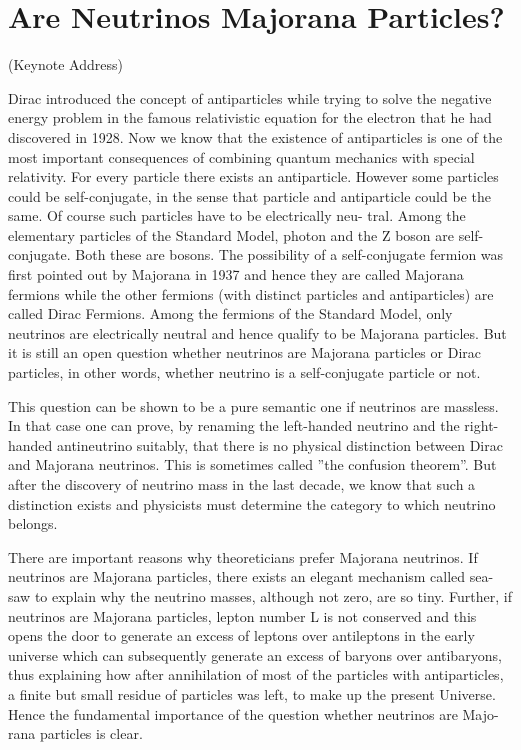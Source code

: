 \chapter{Are Neutrinos Majorana Particles?}\label{chap9}
{\centering\hspace{3.5cm} (Keynote Address)}

\vspace{.2cm}
\lhead[\small\thepage]{\small\leftmark}


Dirac introduced the concept of antiparticles while trying to solve the negative energy
problem in the famous relativistic equation for the electron that he had discovered in 1928.
Now we know that the existence of antiparticles is one of the most important consequences
of combining quantum mechanics with special relativity. For every particle there exists
an antiparticle. However some particles could be self-conjugate, in the sense that particle
and antiparticle could be the same. Of course such particles have to be electrically neu-
tral. Among the elementary particles of the Standard Model, photon and the Z boson are
self-conjugate. Both these are bosons. The possibility of a self-conjugate fermion was first
pointed out by Majorana in 1937 and hence they are called Majorana fermions while the
other fermions (with distinct particles and antiparticles) are called Dirac Fermions. Among
the fermions of the Standard Model, only neutrinos are electrically neutral and hence qualify
to be Majorana particles. But it is still an open question whether neutrinos are Majorana
particles or Dirac particles, in other words, whether neutrino is a self-conjugate particle or
not.


This question can be shown to be a pure semantic one if neutrinos are massless. In that
case one can prove, by renaming the left-handed neutrino and the right-handed antineutrino
suitably, that there is no physical distinction between Dirac and Majorana neutrinos. This
is sometimes called ”the confusion theorem”. But after the discovery of neutrino mass in
the last decade, we know that such a distinction exists and physicists must determine the
category to which neutrino belongs.

There are important reasons why theoreticians prefer Majorana neutrinos. If neutrinos
are Majorana particles, there exists an elegant mechanism called sea-saw to explain why
the neutrino masses, although not zero, are so tiny. Further, if neutrinos are Majorana
particles, lepton number L is not conserved and this opens the door to generate an excess
of leptons over antileptons in the early universe which can subsequently generate an excess
of baryons over antibaryons, thus explaining how after annihilation of most of the particles
with antiparticles, a finite but small residue of particles was left, to make up the present
Universe. Hence the fundamental importance of the question whether neutrinos are Majo-
rana particles is clear.

